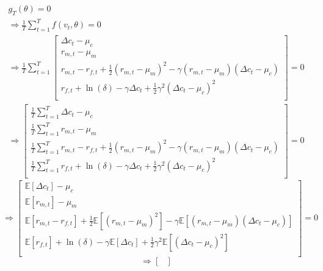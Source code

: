 \begin{enumerate}[(a)]
      \begin{gather*}
        g_T(\theta) = 0\\
        \Rightarrow\frac{1}{T} \sum_{t=1}^T f(v_t,\theta) = 0\\
        \Rightarrow\frac{1}{T} \sum_{t=1}^T \begin{bmatrix}
          \Delta c_t - \mu_c \\
          r_{m,t} - \mu_m \\
          r_{m,t} - r_{f,t} + \frac{1}{2} (r_{m,t} - \mu_m)^2 - \gamma (r_{m,t} - \mu_m)(\Delta c_t - \mu_c) \\
          r_{f,t} + \ln(\delta) -\gamma\Delta c_t +  \frac{1}{2}\gamma^2 (\Delta c_t - \mu_c)^2 \\
        \end{bmatrix} = 0 
      \end{gather*}
        \begin{gather*}
        \Rightarrow \begin{bmatrix}
          \frac{1}{T} \sum_{t=1}^T \Delta c_t - \mu_c \\
          \frac{1}{T} \sum_{t=1}^T r_{m,t} - \mu_m \\
          \frac{1}{T} \sum_{t=1}^T r_{m,t} - r_{f,t} + \frac{1}{2} (r_{m,t} - \mu_m)^2 - \gamma (r_{m,t} - \mu_m)(\Delta c_t - \mu_c) \\
          \frac{1}{T} \sum_{t=1}^T r_{f,t} + \ln(\delta) -\gamma\Delta c_t +  \frac{1}{2}\gamma^2 (\Delta c_t - \mu_c)^2 \\
        \end{bmatrix} = 0 
      \end{gather*}
      \begin{equation*}
        \Rightarrow \begin{bmatrix}
          \mathbb{E} [\Delta c_t] - \mu_c \\
          \mathbb{E} [r_{m,t}] - \mu_m \\
          \mathbb{E} [r_{m,t}- r_{f,t}]  + \frac{1}{2}\mathbb{E} [ (r_{m,t} - \mu_m)^2] - \gamma \mathbb{E} [(r_{m,t} - \mu_m)(\Delta c_t - \mu_c)] \\
          \mathbb{E} [r_{f,t}] + \ln(\delta) -\gamma\mathbb{E} [\Delta c_t] +  \frac{1}{2}\gamma^2 \mathbb{E} [(\Delta c_t - \mu_c)^2] \\
        \end{bmatrix} = 0
      \end{equation*}
      \begin{equation*}
        \Rightarrow \begin{bmatrix}

\end{bmatrix}
\end{equation*}
\end{enumerate}
